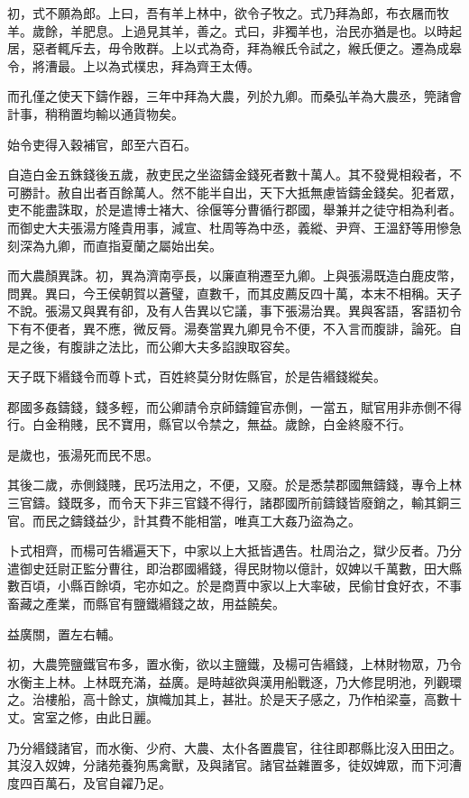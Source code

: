 初，式不願為郎。上曰，吾有羊上林中，欲令子牧之。式乃拜為郎，布衣屩而牧羊。歲餘，羊肥息。上過見其羊，善之。式曰，非獨羊也，治民亦猶是也。以時起居，惡者輒斥去，毋令敗群。上以式為奇，拜為緱氏令試之，緱氏便之。遷為成皋令，將漕最。上以為式樸忠，拜為齊王太傅。

而孔僅之使天下鑄作器，三年中拜為大農，列於九卿。而桑弘羊為大農丞，筦諸會計事，稍稍置均輸以通貨物矣。

始令吏得入穀補官，郎至六百石。

自造白金五銖錢後五歲，赦吏民之坐盜鑄金錢死者數十萬人。其不發覺相殺者，不可勝計。赦自出者百餘萬人。然不能半自出，天下大抵無慮皆鑄金錢矣。犯者眾，吏不能盡誅取，於是遣博士褚大、徐偃等分曹循行郡國，舉兼并之徒守相為利者。而御史大夫張湯方隆貴用事，減宣、杜周等為中丞，義縱、尹齊、王溫舒等用慘急刻深為九卿，而直指夏蘭之屬始出矣。

而大農顏異誅。初，異為濟南亭長，以廉直稍遷至九卿。上與張湯既造白鹿皮幣，問異。異曰，今王侯朝賀以蒼璧，直數千，而其皮薦反四十萬，本末不相稱。天子不說。張湯又與異有卻，及有人告異以它議，事下張湯治異。異與客語，客語初令下有不便者，異不應，微反脣。湯奏當異九卿見令不便，不入言而腹誹，論死。自是之後，有腹誹之法比，而公卿大夫多諂諛取容矣。

天子既下緡錢令而尊卜式，百姓終莫分財佐縣官，於是告緡錢縱矣。

郡國多姦鑄錢，錢多輕，而公卿請令京師鑄鐘官赤側，一當五，賦官用非赤側不得行。白金稍賤，民不寶用，縣官以令禁之，無益。歲餘，白金終廢不行。

是歲也，張湯死而民不思。

其後二歲，赤側錢賤，民巧法用之，不便，又廢。於是悉禁郡國無鑄錢，專令上林三官鑄。錢既多，而令天下非三官錢不得行，諸郡國所前鑄錢皆廢銷之，輸其銅三官。而民之鑄錢益少，計其費不能相當，唯真工大姦乃盜為之。

卜式相齊，而楊可告緡遍天下，中家以上大抵皆遇告。杜周治之，獄少反者。乃分遣御史廷尉正監分曹往，即治郡國緡錢，得民財物以億計，奴婢以千萬數，田大縣數百頃，小縣百餘頃，宅亦如之。於是商賈中家以上大率破，民偷甘食好衣，不事畜藏之產業，而縣官有鹽鐵緡錢之故，用益饒矣。

益廣關，置左右輔。

初，大農筦鹽鐵官布多，置水衡，欲以主鹽鐵，及楊可告緡錢，上林財物眾，乃令水衡主上林。上林既充滿，益廣。是時越欲與漢用船戰逐，乃大修昆明池，列觀環之。治樓船，高十餘丈，旗幟加其上，甚壯。於是天子感之，乃作柏梁臺，高數十丈。宮室之修，由此日麗。

乃分緡錢諸官，而水衡、少府、大農、太仆各置農官，往往即郡縣比沒入田田之。其沒入奴婢，分諸苑養狗馬禽獸，及與諸官。諸官益雜置多，徒奴婢眾，而下河漕度四百萬石，及官自糴乃足。

